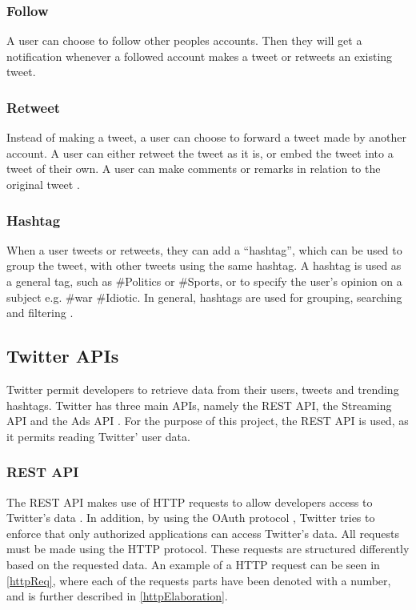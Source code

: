 \subsubsection{Follow}
A user can choose to follow other peoples accounts. Then they will get a
notification whenever a followed account makes a tweet or retweets an existing
tweet.

\subsubsection{Retweet}
Instead of making a tweet, a user can choose to forward a tweet made by another
account. A user can either retweet the tweet as it is, or embed the tweet into a
tweet of their own. A user can make comments or remarks in relation to the
original tweet .

\subsubsection{Hashtag}
When a user tweets or retweets, they can add a ``hashtag'', which can be used to
group the tweet, with other tweets using the same hashtag. A hashtag is used as
a general tag, such as \#Politics or \#Sports, or to specify the user's
opinion on a subject e.g. \#war \#Idiotic. In general, hashtags are used for
grouping, searching and filtering  .

\subsection{Twitter \acp{API}}
Twitter permit developers to retrieve data from their users, tweets and
trending hashtags. Twitter has three main \acp{API}, namely the \ac{REST} \ac{API}, the Streaming
\ac{API} and the Ads \ac{API} \citep{TwitterDevDocs}. For the purpose of this
project, the \ac{REST} \ac{API} is used, as it permits reading Twitter' user
data.

\subsubsection{REST API}
The \ac{REST} \ac{API} makes use of \ac{HTTP} requests to allow developers
access to Twitter's data \citep{TwitterREST}. In addition, by using the OAuth protocol
\citep{TwitterOAuth}, Twitter tries to enforce that only authorized applications
can access Twitter's data. All requests must be made using the
\ac{HTTP} protocol. These requests are structured differently based on the
requested data. An example of a \ac{HTTP} request can be seen in
\autoref{httpReq}, where each of the requests parts have been denoted with a
number, and is further described in \autoref{httpElaboration}.

